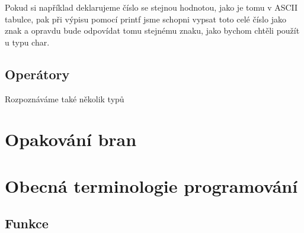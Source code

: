 \documentclass[twoside,a4paper]{article} %
\begin{document}
Pokud si například deklarujeme číslo se stejnou hodnotou, jako je tomu v ASCII tabulce, pak při výpisu pomocí printf jsme schopni vypsat toto celé číslo jako znak a opravdu bude odpovídat tomu stejnému znaku, jako bychom chtěli použít u typu char.

\subsection{Operátory}
Rozpoznáváme také několik typů 

\section{Opakování bran}

\section{Obecná terminologie programování}
\subsection{Funkce}


\newpage

\newpage
{}
\printbibliography
\nocite{*}
\end{document}
